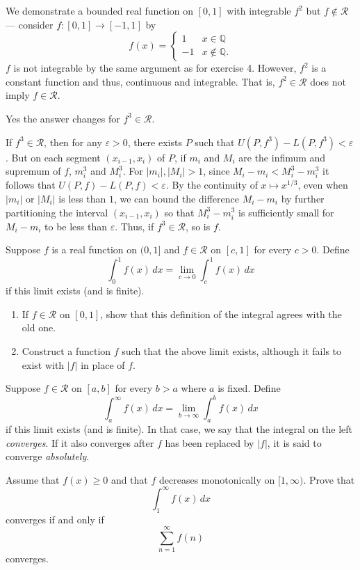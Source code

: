 \documentclass[12 pt, letterpaper]{hmcpset}
\begin{document}
\begin{solution}
	We demonstrate a bounded real function on $[0, 1]$ with integrable $f^{2}$ but $f \notin \mathscr{R}$ --- consider $f : [0, 1] \to [-1, 1]$ by
	\[
		f(x) = \begin{cases}
			1 & x \in \mathbb{Q} \\
			-1 & x \notin \mathbb{Q}.
		\end{cases}
	\]
	$f$ is not integrable by the same argument as for exercise 4. However, $f^{2}$ is a constant function and thus, continuous and integrable. That is, $f^{2} \in \mathscr{R}$ does not imply $f \in \mathscr{R}$.

	Yes the answer changes for $f^{3} \in \mathscr{R}$.

	If $f^{3} \in \mathscr{R}$, then for any $\varepsilon > 0$, there exists $P$ such that $U(P, f^{3}) - L(P, f^{3}) < \varepsilon$. But on each segment $(x_{i - 1}, x_{i})$ of $P$, if $m_{i}$ and $M_{i}$ are the infimum and supremum of $f$, $m_{i}^{3}$ and $M_{i}^{3}$. For $\lvert m_{i} \rvert, \lvert M_{i} \rvert > 1$, since $M_{i} - m_{i} < M_{i}^{3} - m_{i}^{3}$ it follows that $U(P, f) - L(P, f) < \varepsilon$. By the continuity of $x \mapsto x^{1/3}$, even when $\lvert m_{i} \rvert$ or $\lvert M_{i} \rvert$ is less than $1$, we can bound the difference $M_{i} - m_{i}$ by further partitioning the interval $(x_{i - 1}, x_{i})$ so that $M_{i}^{3} - m_{i}^{3}$ is sufficiently small for $M_{i} - m_{i}$ to be less than $\varepsilon$. Thus, if $f^{3} \in \mathscr{R}$, so is $f$.
\end{solution}

\pagebreak

\begin{problem}[7. $\star$]
	Suppose $f$ is a real function on $(0, 1]$ and $f \in \mathscr{R}$ on $[c, 1]$ for every $c > 0$. Define
	\[
		\int_{0}^{1} f(x) \, dx = \lim_{c \to 0} \int_{c}^{1} f(x) \, dx
	\]
	if this limit exists (and is finite).
	\begin{enumerate}
		\item If $f \in \mathscr{R}$ on $[0, 1]$, show that this definition of the integral agrees with the old one.
		\item Construct a function $f$ such that the above limit exists, although it fails to exist with $\lvert f \rvert$ in place of $f$.
	\end{enumerate}
\end{problem}

\pagebreak

\begin{problem}[8. $\star$]
	Suppose $f \in \mathscr{R}$ on $[a, b]$ for every $b > a$ where $a$ is fixed. Define
	\[
		\int_{a}^{\infty} f(x) \, dx = \lim_{b \to \infty} \int_{a}^{b} f(x) \, dx
	\]
	if this limit exists (and is finite). In that case, we say that the integral on the left \emph{converges}. If it also converges after $f$ has been replaced by $\lvert f \rvert$, it is said to converge \emph{absolutely}.

	Assume that $f(x) \ge 0$ and that $f$ decreases monotonically on $[1, \infty)$. Prove that
	\[
		\int_{1}^{\infty} f(x) \, dx 
	\]
	converges if and only if
	\[
		\sum_{n = 1}^{\infty} f(n)
	\]
	converges.
\end{problem}
\end{document}
